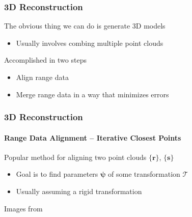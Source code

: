 \documentclass[xetex,professionalfont]{beamer}
\renewcommand{\vec}[1]{\ensuremath{\mathbf{#1}}}
\newcommand{\vr}{\vec{r}}
\newcommand{\vs}{\vec{s}}
\newcommand{\trans}{\mathcal{T}}
\begin{document}

\begin{frame}
\frametitle{3D Reconstruction}

The obvious thing we can do is generate 3D models
\begin{itemize}
	\item Usually involves combing multiple point clouds %
\end{itemize}

\bigskip
Accomplished in two steps %
\begin{itemize}
	\item Align range data
	\item Merge range data in a way that minimizes errors %
\end{itemize}

\end{frame}


\begin{frame}
\frametitle{3D Reconstruction}
\framesubtitle{Range Data Alignment -- Iterative Closest Points}

Popular method for aligning two point clouds $\{\vr\}$, $\{\vs\}$
\begin{itemize}
	\item Goal is to find parameters $\boldsymbol{\psi}$ of some transformation $\trans$
	\item Usually assuming a rigid transformation %
\end{itemize}

\bigskip
\begin{center}
    {\centering Images from \cite{aiger2008}}
\end{center}

\end{frame}
\end{document}
